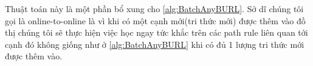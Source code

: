 Thuật toán này là một phần bổ xung cho \autoref{alg:BatchAnyBURL}. Sở dĩ chúng tôi gọi là online-to-online là vì khi có một cạnh mới(tri thức mới) được thêm vào đồ thị chúng tôi sẽ thực hiện việc học ngay tức khắc trên các path rule liên quan tới cạnh đó không giống như ở \autoref{alg:BatchAnyBURL} khi có đủ 1 lượng tri thức mới được thêm vào.
